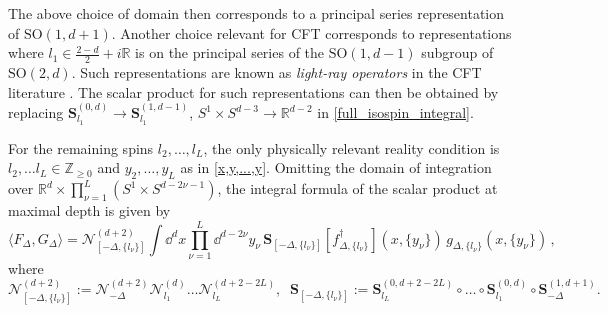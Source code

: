 \documentclass{article}
\def \Dg {\Delta}
\def \Zs {\mathbb{Z}}
\def \Rs {\mathbb{R}}
\begin{document}
    The above choice of domain then corresponds to a principal series representation of $\mathrm{SO}(1,d+1)$. Another choice relevant for CFT corresponds to representations where $l_1 \in \frac{2-d}{2} + i \Rs$ is on the principal series of the $\mathrm{SO}(1,d-1)$ subgroup of $\mathrm{SO}(2,d)$. Such representations are known as \emph{light-ray operators} in the CFT literature \cite{kravchuk2018light}. The scalar product for such representations can then be obtained by replacing $\mathbf{S}_{l_1}^{(0,d)} \rightarrow \mathbf{S}_{l_1}^{(1,d-1)}$, $S^1\times S^{d-3} \rightarrow \Rs^{d-2}$ in \eqref{full_isospin_integral}. 
    
   For the remaining spins $l_2,\dots,l_L$, the only physically relevant reality condition is $l_2,\dots l_L \in \Zs_{\geq 0}$ and $y_2,\dots,y_L$ as in \eqref{x,y,...,y}. Omitting the domain of integration over $\Rs^d \times \prod_{\nu=1}^L (S^1\times S^{d-2\nu-1})$, the integral formula of the scalar product at maximal depth is given by
\begin{equation}
    \langle F_{\Dg}, G_{\Dg} \rangle = \mathcal{N}^{(d+2)}_{[-\Dg,\{l_{\nu}\}]} \int \dd^d x\prod_{\nu=1}^L \dd^{d-2\nu} y_{\nu}\, \mathbf{S}_{[-\Dg,\{l_{\nu}\}]} [f_{\Dg,\{l_{\nu}\}}^{\dagger}](x,\{y_{\nu}\}) \, g_{\Dg,\{l_{\nu}\}} (x,\{y_{\nu}\})\,,
\end{equation}
where
\begin{equation}
\mathcal{N}^{(d+2)}_{[-\Dg,\{l_{\nu}\}]} := \mathcal{N}^{(d+2)}_{-\Dg} \mathcal{N}^{(d)}_{l_1} \dots     \mathcal{N}^{(d+2-2L)}_{l_L}, \,\,\ \mathbf{S}_{[-\Dg,\{l_{\nu}\}]} := \mathbf{S}^{(0,d+2-2L)}_{l_L} \circ \dots \circ \mathbf{S}^{(0,d)}_{l_1} \circ \mathbf{S}^{(1,d+1)}_{-\Dg}.
\end{equation}
    
\end{document}
